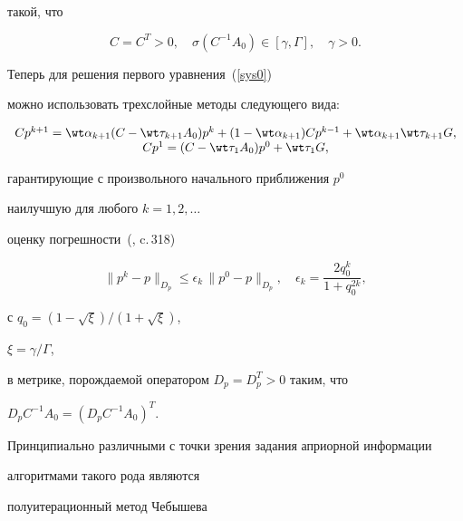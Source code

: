 такой, что


$$


C=C^T>0,\quad \sigma (C^{-1}A_0 ) \in[\gamma,\Gamma], \quad \gamma > 0.


$$


Теперь для решения первого уравнения~(\ref{sys0})


можно использовать трехслойные методы следующего вида:


\begin{equation}


\label{3varmeth}


\begin{array}{c}


C p^{k+1} = \wt \alpha_{k+1} ( C - \wt \tau_{k+1} A_0)p^k +


( 1 - \wt \alpha_{k+1} ) C p^{k-1} + \wt \alpha_{k+1} \wt \tau_{k+1} G, \\


C p^1 = ( C - \wt \tau_{1} A_0)p^0 +\wt \tau_{1} G,


\end{array}


\end{equation}


гарантирующие с произвольного начального приближения $p^0$


наилучшую для любого $k = 1, 2, \dotsc$


оценку погрешности~(\cite{SamNik}, c.\,318)


\begin{equation}


\label{estimp}


\|p^k-p\|_{D_p}\leq\epsilon_k \,\|p^0-p\|_{D_p},\quad


\epsilon_k = \frac{2 q_0^k}{1 + q_0^{2k}},


\end{equation}


с $q_0 = (1 - \sqrt{\xi})/(1 + \sqrt{\xi})$,


$\xi = \gamma / \Gamma$,


в метрике, порождаемой оператором $D_p = D_p^T > 0$ таким, что


$D_pC^{-1}A_0 = (D_pC^{-1}A_0)^T$.


Принципиально различными с точки зрения задания априорной информации


алгоритмами такого рода являются





полуитерационный метод Чебышева


